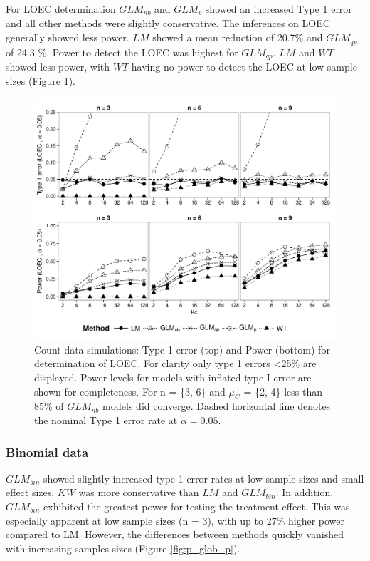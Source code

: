 \documentclass[twocolumn, natbib]{svjour3}
\begin{document}
For LOEC determination $GLM_{nb}$ and $GLM_{p}$ showed an increased Type 1 error and all other methods were slightly conservative.
The inferences on LOEC generally showed less power.
$LM$ showed a mean reduction of 20.7\% and $GLM_{qp}$ of 24.3 \%.
Power to detect the LOEC was highest for $GLM_{qp}$. 
$LM$ and $WT$ showed less power, with $WT$ having no power to detect the LOEC at low sample sizes (Figure \ref{fig:p_loec_c}).

\begin{figure}
  \centering
  \includegraphics[width = 126mm]{p_loec_c.pdf}
  \caption{Count data simulations: Type 1 error (top) and Power (bottom) for determination of LOEC.
  For clarity only type 1 errors \textless 25\% are displayed.
  Power levels for models with inflated type I error are shown for completeness.
  For n = \{3, 6\} and $\mu_C$ = \{2, 4\} less than 85\% of $GLM_{nb}$ models did converge.
  Dashed horizontal line denotes the nominal Type 1 error rate at $\alpha = 0.05$.
  }
  \label{fig:p_loec_c}
\end{figure}


\subsubsection{Binomial data}

$GLM_{bin}$ showed slightly increased type 1 error rates at low sample sizes and small effect sizes.
$KW$ was more conservative than $LM$ and $GLM_{bin}$.
In addition, $GLM_{bin}$ exhibited the greatest power for testing the treatment effect. 
This was especially apparent at low sample sizes (n = 3), with up to 27\% higher power compared to LM.
However, the differences between methods quickly vanished with increasing samples sizes (Figure \ref{fig:p_glob_p}).
\end{document}

